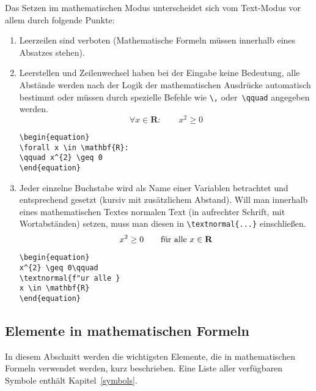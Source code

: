 Das Setzen im mathematischen Modus unterscheidet sich vom
Text-Modus vor allem durch folgende Punkte:
\begin{enumerate}
\item Leerzeilen sind verboten (Mathematische Formeln müssen
  innerhalb eines Absatzes stehen).

\item Leerstellen und Zeilenwechsel haben bei der Eingabe keine
  Bedeutung, alle Abstände werden nach der Logik der
  mathematischen Ausdrücke automatisch bestimmt oder müssen
  durch spezielle Befehle wie \verb|\,| oder~\verb|\qquad|
  angegeben werden.
\exa
\begin{equation}
\forall x \in \mathbf{R}:
\qquad x^{2} \geq 0
\end{equation}
\exb
\begin{verbatim}
\begin{equation}
\forall x \in \mathbf{R}:
\qquad x^{2} \geq 0
\end{equation}
\end{verbatim}
\exc
 
\item Jeder einzelne Buchstabe wird als Name einer Variablen
  betrachtet und entsprechend gesetzt (kursiv mit
  zusätzlichem Abstand).  Will man innerhalb eines
  mathematischen Textes normalen Text (in aufrechter Schrift, mit
  Wortabständen) setzen, muss man diesen in
  \verb|\textnormal{...}| einschließen.
\exa
\begin{equation}
x^{2} \geq 0\qquad
\textnormal{für alle }
x \in \mathbf{R}
\end{equation}
\exb
\begin{verbatim}
\begin{equation}
x^{2} \geq 0\qquad
\textnormal{f"ur alle }
x \in \mathbf{R}
\end{equation}
\end{verbatim}
\exc
 
 
\end{enumerate}
 
\subsection{Elemente in mathematischen Formeln}
 
In diesem Abschnitt werden die wichtigsten Elemente, die in
mathematischen Formeln verwendet werden, kurz beschrieben.  Eine
Liste aller verfügbaren Symbole enthält
Kapitel~\ref{symbols}.
 
\bigskip

